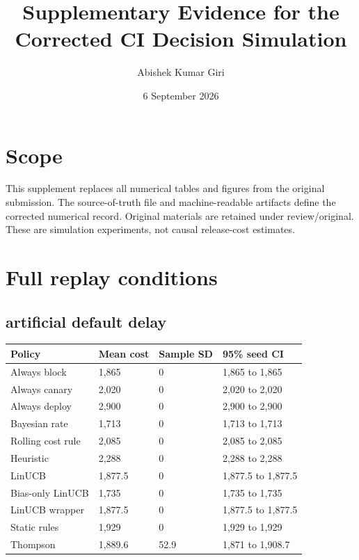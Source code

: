 \documentclass[
  10pt,
]{article}
\title{Supplementary Evidence for the Corrected CI Decision Simulation}
\author{Abishek Kumar Giri}
\date{6 September 2026}
\begin{document}
\maketitle

\section{Scope}\label{scope}

This supplement replaces all numerical tables and figures from the
original submission. The source-of-truth file and machine-readable
artifacts define the corrected numerical record. Original materials are
retained under review/original. These are simulation experiments, not
causal release-cost estimates.

\section{Full replay conditions}\label{full-replay-conditions}

\subsection{artificial default delay}\label{artificial-default-delay}

\par\medskip\noindent\begin{minipage}{\linewidth}\centering
\begin{tabular}{@{}llll@{}}
\toprule\noalign{}
Policy & Mean cost & Sample SD & 95\% seed CI \\
\midrule\noalign{}
Always block & 1,865 & 0 & 1,865 to 1,865 \\
Always canary & 2,020 & 0 & 2,020 to 2,020 \\
Always deploy & 2,900 & 0 & 2,900 to 2,900 \\
Bayesian rate & 1,713 & 0 & 1,713 to 1,713 \\
Rolling cost rule & 2,085 & 0 & 2,085 to 2,085 \\
Heuristic & 2,288 & 0 & 2,288 to 2,288 \\
LinUCB & 1,877.5 & 0 & 1,877.5 to 1,877.5 \\
Bias-only LinUCB & 1,735 & 0 & 1,735 to 1,735 \\
LinUCB wrapper & 1,877.5 & 0 & 1,877.5 to 1,877.5 \\
Static rules & 1,929 & 0 & 1,929 to 1,929 \\
Thompson & 1,889.6 & 52.9 & 1,871 to 1,908.7 \\
\bottomrule
\end{tabular}
\end{minipage}\par\medskip
\end{document}
